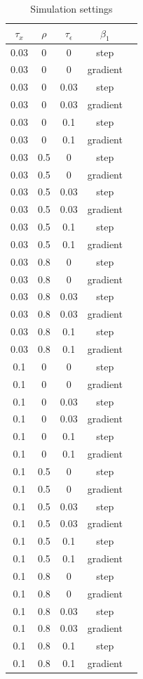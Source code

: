 \documentclass[authoryear, review, 11pt]{elsarticle}
\begin{document}
	\begin{table}[ht]
		\caption{Simulation settings} %
		\vspace{1mm}
		\centering  %
		\begin{tabular}{c c c c c} %
		\hline\hline                        %
		$\tau_x$ & $\rho$ & $\tau_\epsilon$ & $\beta_1$ \\ %
		\hline                  %
		0.03 & 0 & 0 & step \\
		0.03 & 0 & 0 & gradient \\
		0.03 & 0 & 0.03 & step \\
		0.03 & 0 & 0.03 & gradient \\
		0.03 & 0 & 0.1 & step \\
		0.03 & 0 & 0.1 & gradient \\
		0.03 & 0.5 & 0 & step \\
		0.03 & 0.5 & 0 & gradient \\
		0.03 & 0.5 & 0.03 & step \\
		0.03 & 0.5 & 0.03 & gradient \\
		0.03 & 0.5 & 0.1 & step \\
		0.03 & 0.5 & 0.1 & gradient \\
		0.03 & 0.8 & 0 & step \\
		0.03 & 0.8 & 0 & gradient \\
		0.03 & 0.8 & 0.03 & step \\
		0.03 & 0.8 & 0.03 & gradient \\
		0.03 & 0.8 & 0.1 & step \\
		0.03 & 0.8 & 0.1 & gradient \\				
		0.1 & 0 & 0 & step \\
		0.1 & 0 & 0 & gradient \\
		0.1 & 0 & 0.03 & step \\
		0.1 & 0 & 0.03 & gradient \\
		0.1 & 0 & 0.1 & step \\
		0.1 & 0 & 0.1 & gradient \\
		0.1 & 0.5 & 0 & step \\
		0.1 & 0.5 & 0 & gradient \\
		0.1 & 0.5 & 0.03 & step \\
		0.1 & 0.5 & 0.03 & gradient \\
		0.1 & 0.5 & 0.1 & step \\
		0.1 & 0.5 & 0.1 & gradient \\
		0.1 & 0.8 & 0 & step \\
		0.1 & 0.8 & 0 & gradient \\
		0.1 & 0.8 & 0.03 & step \\
		0.1 & 0.8 & 0.03 & gradient \\
		0.1 & 0.8 & 0.1 & step \\
		0.1 & 0.8 & 0.1 & gradient \\						

		\hline %
		\end{tabular}
		\label{table:simulation_settings} %
	\end{table}
	
\end{document}
